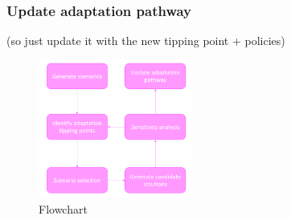 \subsubsection{Update adaptation pathway}
(so just update it with the new tipping point + policies)


\begin{figure}[h!]
    \centering
    \includegraphics[width=0.45\textwidth]{report/figures/flowchart.png} 
    \caption{Flowchart}
    \label{fig:flowchart}
\end{figure}






